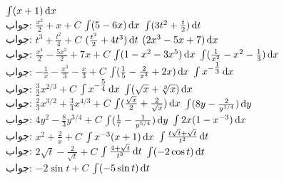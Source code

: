 $\int (x+1)\dif x$\\
جواب:\quad
$\tfrac{x^2}{2}+x+C$
$\int(5-6x)\dif x$
$\int(3t^2+\tfrac{t}{2})\dif t$\\
جواب:\quad
$t^3+\tfrac{t^2}{4}+C$
$(\tfrac{t^2}{2}+4t^3)\dif t$
$(2x^3-5x+7)\dif x$\\
جواب:\quad
$\tfrac{x^4}{2}-\tfrac{5x^2}{2}+7x+C$
$\int(1-x^2-3x^5)\dif x$
$\int(\tfrac{1}{x^2}-x^2-\tfrac{1}{3})\dif x$\\
جواب:\quad
$-\tfrac{1}{x}-\tfrac{x^3}{3}-\tfrac{x}{3}+C$
$\int(\tfrac{1}{5}-\tfrac{2}{x^3}+2x)\dif x$
$\int x^{-\tfrac{1}{3}}\dif x$\\
جواب:\quad
$\tfrac{3}{2}x^{2/3}+C$
$\int x^{-\tfrac{5}{4}}\dif x$
$\int(\sqrt{x}+\sqrt[3]{x})\dif x$\\
جواب:\quad
$\tfrac{2}{3}x^{3/2}+\tfrac{3}{4}x^{4/3}+C$
$\int(\tfrac{\sqrt{x}}{2}+\tfrac{2}{\sqrt{x}})\dif x$
$\int(8y-\tfrac{2}{y^{1/4}})\dif y$\\
جواب:\quad
$4y^2-\tfrac{8}{3}y^{3/4}+C$
$\int(\tfrac{1}{7}-\tfrac{1}{y^{5/4}})\dif y$
$\int 2x(1-x^{-3})\dif x$\\
جواب:\quad
$x^2+\tfrac{2}{x}+C$
$\int x^{-3}(x+1)\dif x$
$\int\tfrac{t\sqrt{t}+\sqrt{t}}{t^2}\dif t$\\
جواب:\quad
$2\sqrt{t}-\tfrac{2}{\sqrt{t}}+C$
$\int\tfrac{4+\sqrt{t}}{t^3}\dif t$
$\int(-2\cos t)\dif t$\\
جواب:\quad
$-2\sin t+C$
$\int (-5\sin t)\dif t$
